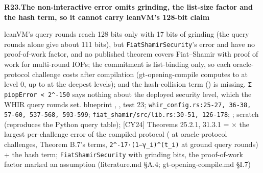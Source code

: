 \par\medskip\noindent\textbf{R23.}\enspace\textbf{The non-interactive error omits grinding, the list-size factor and the hash term, so it cannot carry leanVM's 128-bit claim}\par\nopagebreak
{} leanVM's query rounds reach 128 bits only with 17 bits of grinding (the query rounds alone give about 111 bits), but \texttt{Fiat\allowbreak{}Shamir\allowbreak{}Security}'s error  and  have no proof-of-work factor, and no published theorem covers Fiat–Shamir with proof of work for multi-round IOPs; the commitment is list-binding only, so each oracle-protocol challenge costs  after compilation (gt-opening-compile computes  to  at level 0, up to  at the deepest levels); and the hash-collision term () is missing. \texttt{Σ piop\allowbreak{}Error < 2\textasciicircum{}-\allowbreak{}150} says nothing about the deployed security level, which the WHIR query rounds set.
 blueprint , , test 23; \texttt{whir\_\allowbreak{}config.\allowbreak{}rs:\allowbreak{}25-\allowbreak{}27,\allowbreak{} 36-\allowbreak{}38,\allowbreak{} 57-\allowbreak{}60,\allowbreak{} 537-\allowbreak{}568,\allowbreak{} 593-\allowbreak{}599}; \texttt{fiat\_\allowbreak{}shamir/\allowbreak{}src/\allowbreak{}lib.\allowbreak{}rs:\allowbreak{}30-\allowbreak{}51,\allowbreak{} 126-\allowbreak{}178}; ; scratch  (reproduces the Python query table); [CY24] Theorems 25.2.1, 31.3.1
  =  × the largest per-challenge error of the compiled protocol ( at oracle-protocol challenges, Theorem B.7's terms, \texttt{2\textasciicircum{}-\allowbreak{}17·(\allowbreak{}1−γ\_\allowbreak{}i)\textasciicircum{}(\allowbreak{}t\_\allowbreak{}i)} at ground query rounds) + the hash term; \texttt{Fiat\allowbreak{}Shamir\allowbreak{}Security} with grinding bits, the proof-of-work factor marked an assumption (literature.md §A.4; gt-opening-compile.md §I.7)

